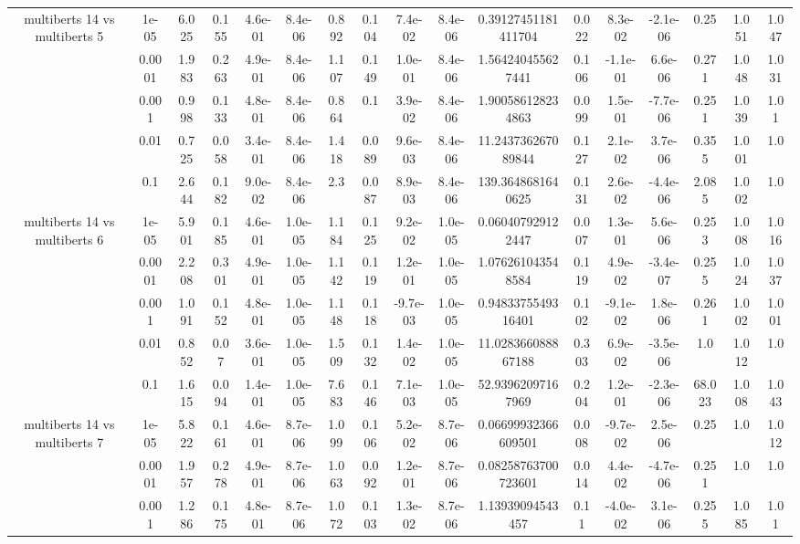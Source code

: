 \begin{tabular}{|c|c|c|c|c|c|c|c|c|c|c|c|c|c|c|c|c|}
\hline
\multirow{5}{*}{multiberts 14 vs multiberts 5} & 1e-05 & 6.025 & 0.155 & 4.6e-01 & 8.4e-06 & 0.892 & 0.104 & 7.4e-02 & 8.4e-06 & 0.39127451181411704 & 0.022 & 8.3e-02 & -2.1e-06 & 0.25 & 1.051 & 1.047 \\
 & 0.0001 & 1.983 & 0.263 & 4.9e-01 & 8.4e-06 & 1.107 & 0.149 & 1.0e-01 & 8.4e-06 & 1.564240455627441 & 0.106 & -1.1e-01 & 6.6e-06 & 0.271 & 1.048 & 1.031 \\
 & 0.001 & 0.998 & 0.133 & 4.8e-01 & 8.4e-06 & 0.864 & 0.1 & 3.9e-02 & 8.4e-06 & 1.900586128234863 & 0.099 & 1.5e-01 & -7.7e-06 & 0.251 & 1.039 & 1.01 \\
 & 0.01 & 0.725 & 0.058 & 3.4e-01 & 8.4e-06 & 1.418 & 0.089 & 9.6e-03 & 8.4e-06 & 11.243736267089844 & 0.127 & 2.1e-02 & 3.7e-06 & 0.355 & 1.001 & 1.0 \\
 & 0.1 & 2.644 & 0.182 & 9.0e-02 & 8.4e-06 & 2.3 & 0.087 & 8.9e-03 & 8.4e-06 & 139.3648681640625 & 0.131 & 2.6e-02 & -4.4e-06 & 2.085 & 1.002 & 1.0 \\
\hline
\multirow{5}{*}{multiberts 14 vs multiberts 6} & 1e-05 & 5.901 & 0.185 & 4.6e-01 & 1.0e-05 & 1.184 & 0.125 & 9.2e-02 & 1.0e-05 & 0.060407929122447 & 0.007 & 1.3e-01 & 5.6e-06 & 0.253 & 1.008 & 1.016 \\
 & 0.0001 & 2.208 & 0.301 & 4.9e-01 & 1.0e-05 & 1.142 & 0.119 & 1.2e-01 & 1.0e-05 & 1.076261043548584 & 0.119 & 4.9e-02 & -3.4e-07 & 0.255 & 1.024 & 1.037 \\
 & 0.001 & 1.091 & 0.152 & 4.8e-01 & 1.0e-05 & 1.148 & 0.118 & -9.7e-03 & 1.0e-05 & 0.9483375549316401 & 0.102 & -9.1e-02 & 1.8e-06 & 0.261 & 1.002 & 1.001 \\
 & 0.01 & 0.852 & 0.07 & 3.6e-01 & 1.0e-05 & 1.509 & 0.132 & 1.4e-02 & 1.0e-05 & 11.028366088867188 & 0.303 & 6.9e-02 & -3.5e-06 & 1.0 & 1.012 & 1.0 \\
 & 0.1 & 1.615 & 0.094 & 1.4e-01 & 1.0e-05 & 7.683 & 0.146 & 7.1e-03 & 1.0e-05 & 52.93962097167969 & 0.204 & 1.2e-01 & -2.3e-06 & 68.023 & 1.008 & 1.043 \\
\hline
\multirow{5}{*}{multiberts 14 vs multiberts 7} & 1e-05 & 5.822 & 0.161 & 4.6e-01 & 8.7e-06 & 1.099 & 0.106 & 5.2e-02 & 8.7e-06 & 0.06699932366609501 & 0.008 & -9.7e-02 & 2.5e-06 & 0.25 & 1.0 & 1.012 \\
 & 0.0001 & 1.957 & 0.278 & 4.9e-01 & 8.7e-06 & 1.063 & 0.092 & 1.2e-01 & 8.7e-06 & 0.08258763700723601 & 0.014 & 4.4e-02 & -4.7e-06 & 0.251 & 1.0 & 1.0 \\
 & 0.001 & 1.286 & 0.175 & 4.8e-01 & 8.7e-06 & 1.072 & 0.103 & 1.3e-02 & 8.7e-06 & 1.13939094543457 & 0.11 & -4.0e-02 & 3.1e-06 & 0.255 & 1.085 & 1.01 \\

\end{tabular}
